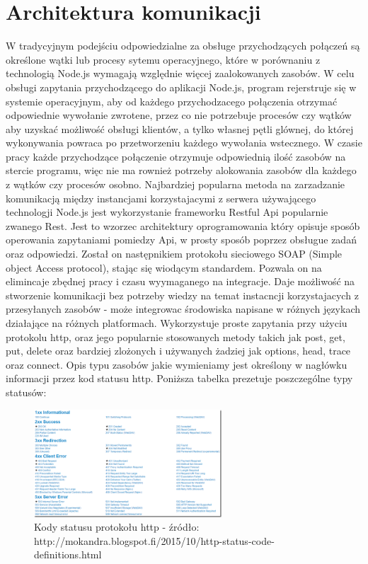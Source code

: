 \documentclass[12pt]{report}
\begin{document}
\section{Architektura komunikacji}
W tradycyjnym podejściu odpowiedzialne za obsługe przychodzących połączeń są określone wątki lub procesy sytemu operacyjnego, które w porównaniu z technologią Node.js wymagają względnie więcej zaalokowanych zasobów. 
W celu obsługi zapytania przychodzącego do aplikacji Node.js, program rejerstruje się w systemie operacyjnym, aby od każdego przychodzacego połączenia otrzymać odpowiednie wywołanie zwrotene, przez co nie potrzebuje procesów czy wątków aby uzyskać możliwość obsługi klientów, a tylko własnej pętli glównej, do której wykonywania powraca po przetworzeniu każdego wywołania wstecznego. 
W czasie pracy każde przychodzące połączenie otrzymuje odpowiednią ilość zasobów na stercie programu, więc nie ma rownież potrzeby alokowania zasobów dla każdego z wątków czy procesów osobno. 
Najbardziej popularna metoda na zarzadzanie komunikacją między instancjami korzystajacymi z serwera używającego technologji Node.js jest wykorzystanie frameworku Restful Api popularnie zwanego Rest. 
Jest to wzorzec architektury oprogramowania który opisuje sposób operowania zapytaniami pomiedzy Api, w prosty sposób poprzez obsługue zadań oraz odpowiedzi. 
Został on następnikiem protokołu sieciowego SOAP (Simple object Access protocol), stając się wiodącym standardem. 
Pozwala on na elimincaje zbędnej pracy i czasu wyymaganego na integracje. 
Daje możliwość na stworzenie komunikacji bez potrzeby wiedzy na temat instacncji korzystajacych z przesyłanych zasobów - może integrowac środowiska napisane w różnych językach działające na różnych platformach. 
Wykorzystuje proste zapytania przy użyciu protokolu http, oraz jego popularnie stosowanych metody takich jak post, get, put, delete oraz bardziej zlożonych i używanych żadziej jak options, head, trace oraz connect. 
Opis typu zasobów jakie wymieniamy jest określony w nagłówku informacji przez kod statusu http. 
Poniższa tabelka prezetuje poszczególne typy statusów:

\begin{figure}[!t]
\centering
\includegraphics[width=7cm]{statuses.png} 
\caption{Kody statusu protokołu http - źródło: http://mokandra.blogspot.fi/2015/10/http-status-code-definitions.html}
\end{figure}
\end{document}
